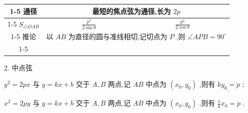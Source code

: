 \documentclass[10pt]{article}
\begin{document}
\begin{center}
{\begin{tabular}{|c|c|c|c|c|}
\cline{1-5}
通径 & \multicolumn{4}{|c|}{最短的焦点弦为通径,长为 \({2p}\)} \\
\cline{1-5}
\({S}_{\bigtriangleup {OAB}}\) & \multicolumn{2}{|c|}{\(\frac{{p}^{2}}{2\sin \theta }\)} & \multicolumn{2}{|c|}{\(\frac{{p}^{2}}{2\cos \theta }\)} \\
\cline{1-5}
推论 & \multicolumn{4}{|c|}{以 \({AB}\) 为直径的圆与准线相切,记切点为 \(P\) ,则 \(\angle {APB} = {90}^{ \circ  }\)} \\
\cline{1-5}
\hline
\end{tabular}
}
\end{center}

2. 中点弦

\({y}^{2} = {2px}\) 与 \(y = {kx} + b\) 交于 \(A,B\) 两点,记 \({AB}\) 中点为 \(\left( {{x}_{0},{y}_{0}}\right)\) ,则有 \(\underline{k{y}_{0} = p}\) ;

\({x}^{2} = {2py}\) 与 \(y = {kx} + b\) 交于 \(A,B\) 两点,记 \({AB}\) 中点为 \(\left( {{x}_{0},{y}_{0}}\right)\) ,则有 \(\frac{1}{k}{x}_{0} = p\) .
\end{document}
